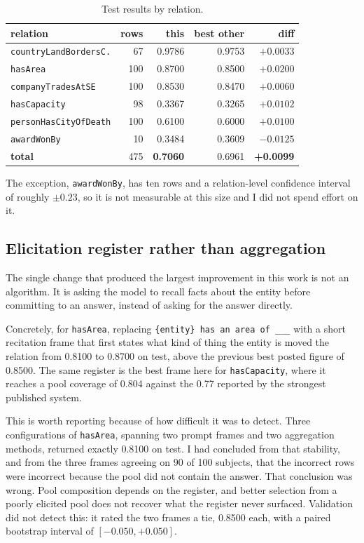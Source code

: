 \documentclass[11pt]{article}
\begin{document}
\begin{table}[t]
\centering\small
\begin{tabular}{lrrrr}
\toprule
relation & rows & this & best other & diff \\
\midrule
\texttt{countryLandBordersC.} & 67 & 0.9786 & 0.9753 & $+0.0033$ \\
\texttt{hasArea} & 100 & 0.8700 & 0.8500 & $+0.0200$ \\
\texttt{companyTradesAtSE} & 100 & 0.8530 & 0.8470 & $+0.0060$ \\
\texttt{hasCapacity} & 98 & 0.3367 & 0.3265 & $+0.0102$ \\
\texttt{personHasCityOfDeath} & 100 & 0.6100 & 0.6000 & $+0.0100$ \\
\texttt{awardWonBy} & 10 & 0.3484 & 0.3609 & $-0.0125$ \\
\midrule
\textbf{total} & 475 & \textbf{0.7060} & 0.6961 & \textbf{+0.0099} \\
\bottomrule
\end{tabular}
\caption{Test results by relation.}
\label{tab:results}
\end{table}

The exception, \texttt{awardWonBy}, has ten rows and a relation-level confidence
interval of roughly $\pm 0.23$, so it is not measurable at this size and I did
not spend effort on it.

\subsection{Elicitation register rather than aggregation}

The single change that produced the largest improvement in this work is not an
algorithm. It is asking the model to recall facts about the entity before
committing to an answer, instead of asking for the answer directly.

Concretely, for \texttt{hasArea}, replacing \texttt{\{entity\} has an area of
\_\_\_} with a short recitation frame that first states what kind of thing the
entity is moved the relation from 0.8100 to 0.8700 on test, above the previous
best posted figure of 0.8500. The same register is the best frame here for
\texttt{hasCapacity}, where it reaches a pool coverage of 0.804 against the 0.77
reported by the strongest published system.

This is worth reporting because of how difficult it was to detect. Three
configurations of \texttt{hasArea}, spanning two prompt frames and two
aggregation methods, returned exactly 0.8100 on test. I had concluded from that
stability, and from the three frames agreeing on 90 of 100 subjects, that the
incorrect rows were incorrect because the pool did not contain the answer. That
conclusion was wrong. Pool composition depends on the register, and better
selection from a poorly elicited pool does not recover what the register never
surfaced. Validation did not detect this: it rated the two frames a tie, 0.8500
each, with a paired bootstrap interval of $[-0.050, +0.050]$.
\end{document}
